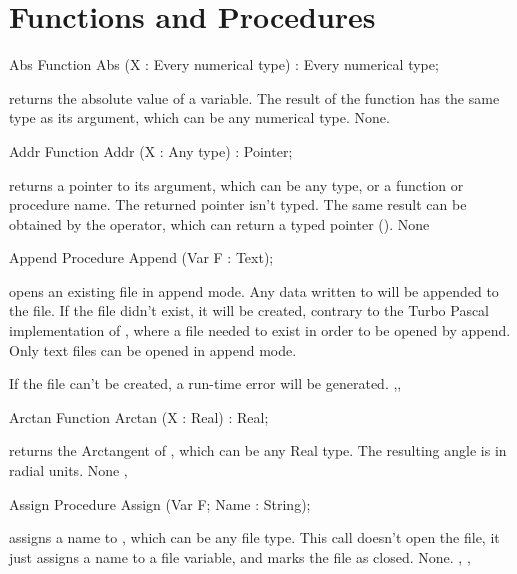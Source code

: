\documentclass{report}
\begin{document}
\section{Functions and Procedures}
\begin{function}{Abs}
\Declaration
Function Abs (X : Every numerical type) : Every numerical type;

\Description
{} returns the absolute value of a variable. The result of the
function has the same type as its argument, which can be any numerical
type.
\Errors
None.
\SeeAlso
{}
\end{function}
\html{}
\begin{function}{Addr}
\Declaration
Function Addr (X : Any type) : Pointer;

\Description
{} returns a pointer to its argument, which can be any type, or a
function or procedure name. The returned pointer isn't typed.
The same result can be obtained by the  operator, which can return a
typed pointer (\progref). 
\Errors
None
\SeeAlso
{}
\end{function}
\html{}
\begin{procedure}{Append}
\Declaration
Procedure Append (Var F : Text);

\Description
{} opens an existing file in append mode. Any data written to
 will be appended to the file. If the file didn't exist, it will be
created, contrary to the Turbo Pascal implementation of , where
a file needed to exist in order to be opened by
append.
Only text files can be opened in append mode.

\Errors
If the file can't be created, a run-time error will be generated.
\SeeAlso
{},, 
\end{procedure}
\html{}
\begin{function}{Arctan}
\Declaration
Function Arctan (X : Real) : Real;

\Description
{} returns the Arctangent of , which can be any Real type.
The resulting angle is in radial units.
\Errors
None
\SeeAlso
{}, 
\end{function}
\html{}
\begin{procedure}{Assign}
\Declaration
Procedure Assign (Var F; Name : String);

\Description
{} assigns a name to , which can be any file type.
This call doesn't open the file, it just assigns a name to a file variable,
and marks the file as closed.
\Errors
None.
\SeeAlso
{}, , 
\end{procedure}
\end{document}
